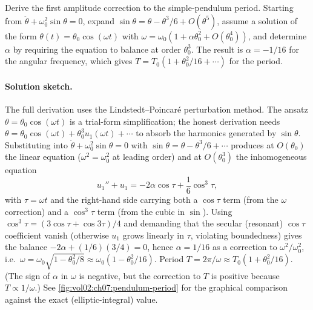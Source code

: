 \begin{exercise}
Derive the first amplitude correction to the simple-pendulum
period. Starting from $\ddot\theta + \omega_{0}^{2}\sin\theta =
0$, expand $\sin\theta = \theta - \theta^{3}/6 + O(\theta^{5})$,
assume a solution of the form $\theta(t) =
\theta_{0}\cos(\omega t)$ with $\omega = \omega_{0}(1 +
\alpha\theta_{0}^{2} + O(\theta_{0}^{4}))$, and determine $\alpha$
by requiring the equation to balance at order $\theta_{0}^{3}$.
The result is $\alpha = -1/16$ for the angular frequency, which
gives $T = T_{0}(1 + \theta_{0}^{2}/16 + \cdots)$ for the period.

\paragraph{Solution sketch.} The full derivation uses the
Lindstedt--Poincar\'e perturbation method. The ansatz $\theta =
\theta_{0} \cos(\omega t)$ is a trial-form simplification; the
honest derivation needs $\theta = \theta_{0} \cos(\omega t) +
\theta_{0}^{3} u_{1}(\omega t) + \cdots$ to absorb the harmonics
generated by $\sin \theta$. Substituting into $\ddot\theta +
\omega_{0}^{2} \sin\theta = 0$ with $\sin\theta = \theta - \theta^{3}/6
+ \cdots$ produces at $O(\theta_{0})$ the linear equation
($\omega^{2} = \omega_{0}^{2}$ at leading order) and at $O(\theta_{0}^{3})$
the inhomogeneous equation
\[
u_{1}'' + u_{1} = -2 \alpha \cos\tau + \frac{1}{6} \cos^{3} \tau,
\]
with $\tau = \omega t$ and the right-hand side carrying both a
$\cos\tau$ term (from the $\omega$ correction) and a $\cos^{3}\tau$
term (from the cubic in $\sin$). Using $\cos^{3}\tau =
(3 \cos\tau + \cos 3\tau)/4$ and demanding that the secular
(resonant) $\cos\tau$ coefficient vanish (otherwise $u_{1}$
grows linearly in $\tau$, violating boundedness) gives the
balance $-2 \alpha + (1/6)(3/4) = 0$, hence $\alpha = 1/16$ as a
correction to $\omega^{2}/\omega_{0}^{2}$, i.e.\ $\omega = \omega_{0}
\sqrt{1 - \theta_{0}^{2}/8} \approx \omega_{0}(1 -
\theta_{0}^{2}/16)$. Period $T = 2\pi/\omega \approx T_{0}(1 +
\theta_{0}^{2}/16)$. (The sign of $\alpha$ in $\omega$ is
negative, but the correction to $T$ is positive because $T \propto
1/\omega$.) See \cref{fig:vol02:ch07:pendulum-period} for the
graphical comparison against the exact (elliptic-integral) value.
\end{exercise}

